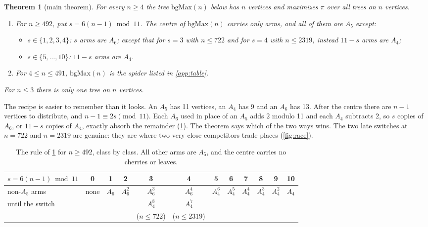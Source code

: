 \documentclass[11pt]{article}
\newtheorem{theorem}{Theorem}
\theoremstyle{definition}
\begin{document}
\begin{theorem}[main theorem]\label{thm:main}
For every $n\ge4$ the tree $\mathrm{bgMax}(n)$ below has $n$ vertices and maximizes $\pi$ over all trees
on $n$ vertices.
\begin{enumerate}
\item For $n\ge 492$, put $s=6(n-1)\bmod 11$. The centre of $\mathrm{bgMax}(n)$ carries only arms, and
  all of them are $A_5$ except:
  \begin{itemize}
  \item $s\in\{1,2,3,4\}$: $s$ arms are $A_6$; except that for $s=3$ with $n\le722$ and for $s=4$ with
    $n\le 2319$, instead $11-s$ arms are $A_4$;
  \item $s\in\{5,\dots,10\}$: $11-s$ arms are $A_4$.
  \end{itemize}
\item For $4\le n\le 491$, $\mathrm{bgMax}(n)$ is the spider listed in \cref{app:table}.
\end{enumerate}
For $n\le3$ there is only one tree on $n$ vertices.
\end{theorem}

The recipe is easier to remember than it looks. An $A_5$ has 11 vertices, an $A_4$ has 9 and an $A_6$
has 13. After the centre there are $n-1$ vertices to distribute, and $n-1\equiv2s\pmod{11}$. Each $A_6$
used in place of an $A_5$ adds $2$ modulo 11 and each $A_4$ subtracts $2$, so $s$ copies of $A_6$, or
$11-s$ copies of $A_4$, exactly absorb the remainder (\cref{tab:rule}). The theorem says which of the two
ways wins. The two late switches at $n=722$ and $n=2319$ are genuine: they are where two very close
competitors trade places (\cref{fig:race}).

\begin{table}[h]\centering\small
\begin{tabular}{@{}l|ccccccccccc@{}}
\toprule
$s=6(n-1)\bmod 11$ & 0 & 1 & 2 & 3 & 4 & 5 & 6 & 7 & 8 & 9 & 10\\
\midrule
non-$A_5$ arms & none & $A_6$ & $A_6^2$ & $A_6^3$ & $A_6^4$ & $A_4^6$ & $A_4^5$ & $A_4^4$ & $A_4^3$ & $A_4^2$ & $A_4$\\
until the switch & & & & $A_4^8$ & $A_4^7$ & & & & & & \\
 & & & & \scriptsize($n\le722$) & \scriptsize($n\le2319$) & & & & & & \\
\bottomrule
\end{tabular}
\caption{The rule of \cref{thm:main} for $n\ge492$, class by class. All other arms are $A_5$, and the
centre carries no cherries or leaves.}
\label{tab:rule}
\end{table}
\end{document}
